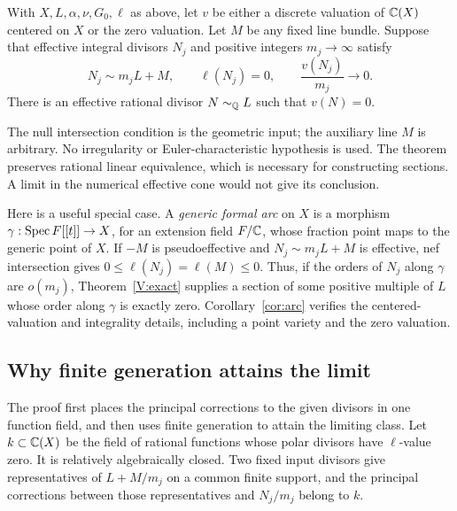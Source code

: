 \begin{samepage}
\begin{theorem}\label{V:exact}
With $X,L,\alpha,\nu,G_0,\ell$ as above, let $v$ be either a discrete
valuation of $\mathbb C(X)$ centered on $X$ or the zero valuation. Let $M$
be any fixed line bundle. Suppose that
effective integral divisors $N_j$ and positive integers $m_j\to\infty$
satisfy
\[
 N_j\sim m_jL+M,\qquad \ell(N_j)=0,\qquad
 \frac{v(N_j)}{m_j}\longrightarrow0.
\]
There is an effective rational divisor $N\sim_{\mathbb Q}L$ such that
$v(N)=0$.
\end{theorem}
\end{samepage}

The null intersection condition is the geometric input; the auxiliary
line $M$ is arbitrary. No irregularity or Euler-characteristic hypothesis
is used. The theorem preserves rational linear equivalence, which is
necessary for constructing sections. A limit in the numerical effective
cone would not give its conclusion.

Here is a useful special case. A \emph{generic formal arc} on $X$ is a
morphism $\gamma:\operatorname{Spec} F[[t]]\to X$, for an extension field $F/\mathbb C$,
whose fraction point maps to the generic point of $X$. If $-M$ is
pseudoeffective and $N_j\sim m_jL+M$ is effective, nef intersection
gives $0\le\ell(N_j)=\ell(M)\le0$. Thus, if the orders of $N_j$
along $\gamma$ are $o(m_j)$, Theorem~\ref{V:exact} supplies a section
of some positive multiple of $L$ whose order along $\gamma$ is exactly
zero. Corollary~\ref{cor:arc} verifies the centered-valuation and
integrality details, including a point variety and the zero valuation.

\subsection{Why finite generation attains the limit}
The proof first places the principal corrections to the given divisors
in one function field, and then uses finite generation to attain the
limiting class.  Let $k\subset\mathbb C(X)$ be the field of rational functions
whose polar divisors have $\ell$-value zero.  It is relatively
algebraically closed.  Two fixed input divisors give representatives
of $L+M/m_j$ on a common finite support, and the principal corrections
between those representatives and $N_j/m_j$ belong to $k$.

